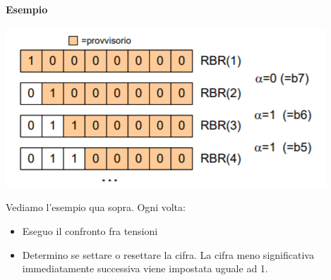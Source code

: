 \documentclass[11pt]{report}
\begin{document}
\paragraph{Esempio}
\begin{center}
\includegraphics{img/236.PNG}
\end{center}
Vediamo l'esempio qua sopra. Ogni volta:
\begin{itemize}
\item Eseguo il confronto fra tensioni
\item Determino se settare o resettare la cifra. La cifra meno significativa immediatamente successiva viene impostata uguale ad 1.
\end{itemize}
\end{document}
